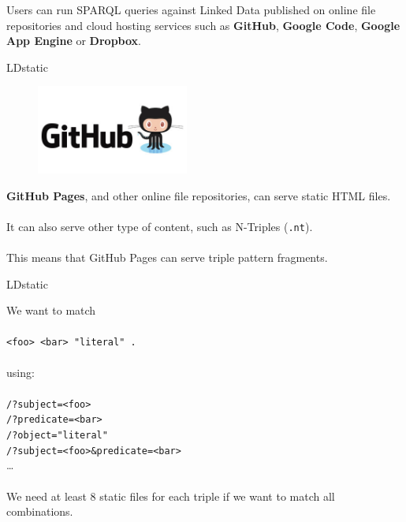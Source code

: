\documentclass[20pt]{extarticle}
\newcommand{\cmr}{\fontencoding{T1}\fontfamily{cmr}\selectfont} %
\begin{document}
{{{{Users can run SPARQL queries against Linked Data published on online file repositories and cloud hosting services such as \textbf{GitHub}, \textbf{Google Code}, \textbf{Google App Engine} or \textbf{Dropbox}.
}
}} 


\newpage

\begin{center}
{\fontsize{35}{35}\color{blue} \sc LDstatic}
\end{center}
\begin{figure}[ht!]

\includegraphics[width=50mm]{GitHub.jpg}
\end{figure}
\vspace{5 mm}
{\fontsize{30}{30} {\cmr 
\noindent \textbf{GitHub Pages}, and other online file repositories, can serve static HTML files.
\\ \\
It can also serve other type of content, such as N-Triples (\texttt{.nt}).
\\ \\
This means that GitHub Pages can serve triple pattern fragments.
}} 


\newpage

\begin{center}
{\fontsize{35}{35}\color{blue} \sc LDstatic}
\end{center}
\vspace{10 mm}
{\fontsize{30}{30} {\cmr 
\noindent We want to match\\\\
\texttt{<foo> <bar> "literal" .}\\\\
using: \\\\
\texttt{/?subject=<foo>}\\
\texttt{/?predicate=<bar>}\\
\texttt{/?object="literal"}\\
\texttt{/?subject=<foo>\&predicate=<bar>}\\
\dots
\\\\
We need at least 8 static files for each triple if we want to match all combinations.
}} 

}
\end{document}
